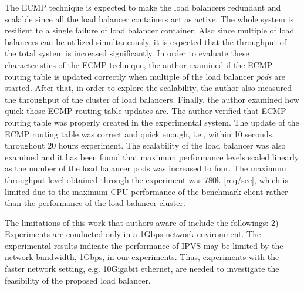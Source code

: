 The ECMP technique is expected to make the load balancers redundant and scalable since all the load balancer containers act as active.
The whole system is resilient to a single failure of load balancer container.
Also since multiple of load balancers can be utilized simultaneously, it is expected that the throughput of the total system is increased significantly.
In order to evaluate these characteristics of the ECMP technique,
the author examined if the ECMP routing table is updated correctly when multiple of the load balancer {\em pods} are started.
After that, in order to explore the scalability, the author also measured the throughput of the cluster of load balancers.
Finally, the author examined how quick those ECMP routing table updates are.
The author verified that ECMP routing table was properly created in the experimental system.
The update of the ECMP routing table was correct and quick enough, i.e., within 10 seconds, throughout 20 hours experiment.
The scalability of the load balancer was also examined and it has been found that maximum performance levels scaled linearly as the number of the load balancer pods was increased to four.
The maximum throughput level obtained through the experiment was 780k [req/sec], which is limited due to the maximum CPU performance of the benchmark client rather than the performance of the load balancer cluster.

%

The limitations of this work that authors aware of include the followings: 
2) Experiments are conducted only in a 1Gbps network environment.
The experimental results indicate the performance of IPVS may be limited by the network bandwidth, 1Gbps, in our experiments. 
Thus, experiments with the faster network setting, e.g. 10Gigabit ethernet, are needed to investigate the feasibility of the proposed load balancer.

